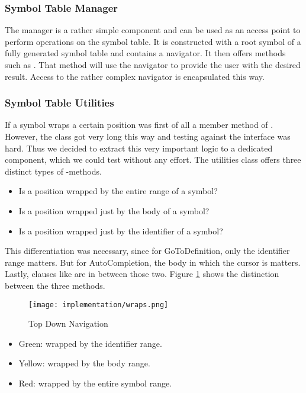 \subsubsection{Symbol Table Manager}
The manager is a rather simple component and can be used as an access point to perform operations on the symbol table.
It is constructed with a root symbol of a fully generated symbol table and contains a navigator.
It then offers methods such as .
That method will use the navigator to provide the user with the desired result.
Access to the rather complex navigator is encapsulated this way.

\subsubsection{Symbol Table Utilities}
If a symbol wraps a certain position was first of all a member method of .
However, the class  got very long this way and testing against the interface was hard.
Thus we decided to extract this very important logic to a dedicated component, which we could test without any effort.
The utilities class offers three distinct types of -methods.
\begin{itemize}
    \item Is a position wrapped by the entire range of a symbol?
    \item Is a position wrapped just by the body of a symbol?
    \item Is a position wrapped just by the identifier of a symbol?
\end{itemize}
This differentiation was necessary, since for GoToDefinition, only the identifier range matters.
But for AutoCompletion, the body in which the cursor is matters.
Lastly, clauses like  are in between those two.
Figure \ref{fig:topDownWraps} shows the distinction between the three methods.

\begin{figure}[H]
    \centering
    \texttt{[image: implementation/wraps.png]}
    \caption{Top Down Navigation}
    \label{fig:topDownWraps}
\end{figure}

\begin{itemize}
    \item Green: wrapped by the identifier range.
    \item Yellow: wrapped by the body range.
    \item Red: wrapped by the entire symbol range.
\end{itemize}


